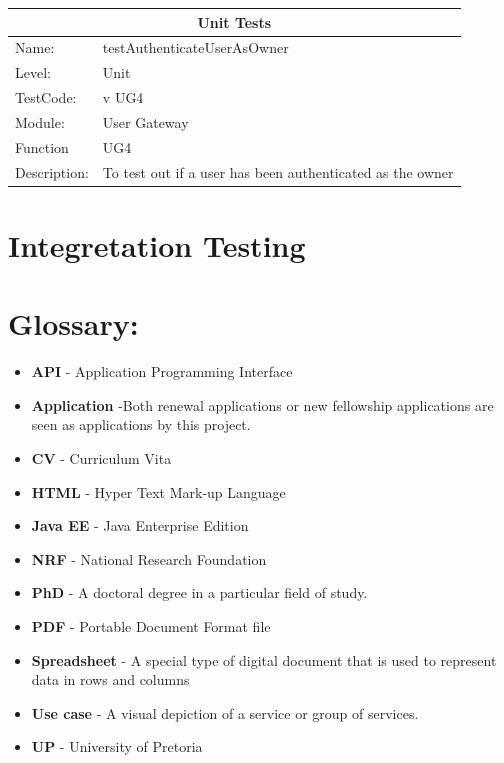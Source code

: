 \documentclass[12pt]{article}
\begin{document}
\begin{center}
\begin{tabular}{|l|p{12cm}|}
\hline
\multicolumn{2}{|c|}{\bf Unit Tests} \\
\hline
 Name: & testAuthenticateUserAsOwner \\
\hline
Level: & Unit \\
\hline
TestCode: & v UG4 \\
\hline
Module:& User Gateway\\
\hline
Function & UG4 \\
\hline
Description: & To test out if a user has been authenticated as the owner \\
\hline

\end{tabular}
\end{center}

\newpage
\section{Integretation Testing}

\newpage
\section{Glossary:}
\vspace{0.2in}

\begin{itemize}

\item \textbf{API} - Application Programming Interface
\item \textbf{Application} -Both renewal applications or new fellowship applications are seen as applications by this project.
\item \textbf{CV} - Curriculum Vita
\item \textbf{HTML} - Hyper Text Mark-up Language
\item \textbf{Java EE} - Java Enterprise Edition
\item \textbf{NRF} - National Research Foundation
\item \textbf{PhD} - A doctoral degree in a particular field of study.
\item \textbf{PDF} - Portable Document Format file
\item \textbf{Spreadsheet} - A special type of digital document that is used to represent data in rows and columns
\item \textbf{Use case} - A visual depiction of a service or group of services.
\item \textbf{UP} - University of Pretoria
 


\end{itemize}	
\end{document}
